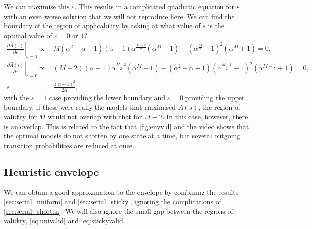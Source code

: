 \documentclass[12pt]{article}
\renewcommand{\pdiff}[2]{\frac{\partial #1}{\partial #2}}
\begin{document}
We can maximise this \wrt $\varepsilon$.
This results in a complicated quadratic equation for $\varepsilon$ with an even worse solution that we will not reproduce here.
We can find the boundary of the region of applicability by asking at what value of $s$ is the optimal value of $\varepsilon=0$ or $1$?
%
\begin{equation}\label{eq:shortenvalid}
\begin{aligned}
  \left.\pdiff{\hat{A}(s)}{\varepsilon}\right|_{\varepsilon=1} \propto &\,
    M(\alpha^2-\alpha+1)(\alpha-1)\alpha^{\frac{M-2}{2}}(\alpha^M-1) - (\alpha^{\frac{M}{2}}-1)^2(\alpha^{M}+1)
      = 0,\\
  \left.\pdiff{\hat{A}(s)}{\varepsilon}\right|_{\varepsilon=0} \propto &\,
    (M-2)(\alpha-1)\alpha^{\frac{M-2}{2}}(\alpha^M-1) - (\alpha^2-\alpha+1)(\alpha^{\frac{M-2}{2}}-1)^2(\alpha^{M-2}+1)
      = 0,\\
    s = &\, \frac{(\alpha-1)^2}{2\alpha},
\end{aligned}
\end{equation}
%
with the $\varepsilon=1$ case providing the lower boundary and $\varepsilon=0$ providing the upper boundary.
If these were really the models that maximised $A(s)$, the region of validity for $M$ would not overlap with that for $M-2$.
In this case, however, there is an overlap.
This is related to the fact that \autoref{fig:envvid} and the video shows that the optimal models do not shorten by one state at a time, but several outgoing transition probabilities are reduced at once.



\subsection{Heuristic envelope}\label{sec:heuristicenv}


We can obtain a good approximation to the envelope by combining the results \autoref{sec:serial_uniform} and \autoref{sec:serial_sticky}, ignoring the complications of \autoref{sec:serial_shorten}.
We will also ignore the small gap between the regions of validity, \eqref{eq:univalid} and \eqref{eq:stickyvalid}.
\end{document}
